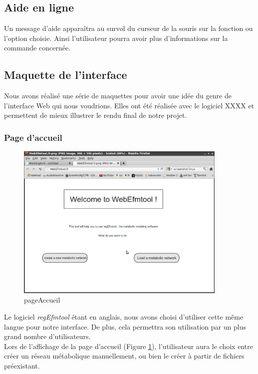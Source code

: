\subsection{Aide en ligne}
Un message d'aide apparaîtra au survol du curseur de la souris sur la fonction ou l'option choisie. Ainsi l'utilisateur pourra avoir plus d'informations sur la commande concernée.

\subsection{Maquette de l'interface}
Nous avons réalisé une série de maquettes pour avoir une idée du genre de l'interface Web qui nous voudrions. Elles ont été réalisée avec le logiciel XXXX et permettent de mieux illustrer le rendu final de notre projet.


\subsubsection{Page d'accueil}

\begin{figure}[!ht]
	\begin{center}
  		\includegraphics[width=0.90\textwidth]{main.png}
  		\caption{pageAccueil}  
  		\label{main}
	\end{center}
\end{figure}

Le logiciel \textit{regEfmtool} étant en anglais, nous avons choisi d'utiliser cette même langue pour notre interface. De plus, cela permettra son utilisation par un plus grand nombre d'utilisateurs. \\
			Lors de l'affichage de la page d'accueil (Figure \ref{main}), l'utilisateur aura le choix entre créer un réseau métabolique manuellement, ou bien le créer à partir de fichiers préexistant. 
	
